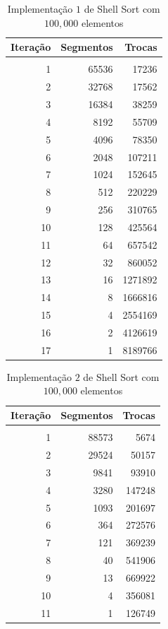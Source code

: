 \documentclass[titlepage,12pt,a4paper]{article}
\begin{document}
    \begin{table}[h]
      \caption{Implementação $1$ de Shell Sort com $100,000$ elementos \label{tab:100000seq1}}
      \begin{center}
        \begin{tabular}{ r | r | r }
          Iteração & Segmentos & Trocas \\
          \hline \\
          1 & 65536 & 17236 \\
          2 & 32768 & 17562 \\
          3 & 16384 & 38259 \\
          4 & 8192 & 55709 \\
          5 & 4096 & 78350 \\
          6 & 2048 & 107211 \\
          7 & 1024 & 152645 \\
          8 & 512 & 220229 \\
          9 & 256 & 310765 \\
          10 & 128 & 425564 \\
          11 & 64 & 657542 \\
          12 & 32 & 860052 \\
          13 & 16 & 1271892 \\
          14 & 8 & 1666816 \\
          15 & 4 & 2554169 \\
          16 & 2 & 4126619 \\
          17 & 1 & 8189766
        \end{tabular}
      \end{center}
    \end{table}

    \begin{table}[h]
      \caption{Implementação $2$ de Shell Sort com $100,000$ elementos \label{tab:100000seq2}}
      \begin{center}
        \begin{tabular}{ r | r | r }
          Iteração & Segmentos & Trocas \\
          \hline \\
          1 & 88573 & 5674 \\
          2 & 29524 & 50157 \\
          3 & 9841 & 93910 \\
          4 & 3280 & 147248 \\
          5 & 1093 & 201697 \\
          6 & 364 & 272576 \\
          7 & 121 & 369239 \\
          8 & 40 & 541906 \\
          9 & 13 & 669922 \\
          10 & 4 & 356081 \\
          11 & 1 & 126749
        \end{tabular}
      \end{center}
    \end{table}
\end{document}
